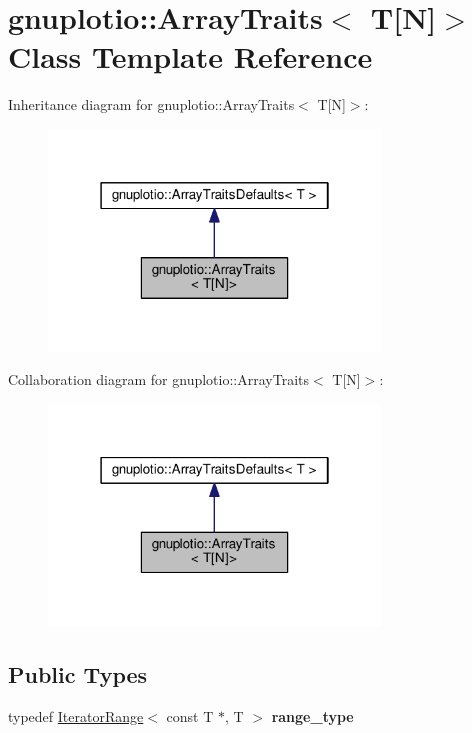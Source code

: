 \hypertarget{classgnuplotio_1_1_array_traits_3_01_t[_n]_4}{}\section{gnuplotio\+:\+:Array\+Traits$<$ T\mbox{[}N\mbox{]}$>$ Class Template Reference}
\label{classgnuplotio_1_1_array_traits_3_01_t[_n]_4}


Inheritance diagram for gnuplotio\+:\+:Array\+Traits$<$ T\mbox{[}N\mbox{]}$>$\+:
\nopagebreak
\begin{figure}[H]
\begin{center}
\leavevmode
\includegraphics[width=250pt]{classgnuplotio_1_1_array_traits_3_01_t[_n]_4__inherit__graph}
\end{center}
\end{figure}


Collaboration diagram for gnuplotio\+:\+:Array\+Traits$<$ T\mbox{[}N\mbox{]}$>$\+:
\nopagebreak
\begin{figure}[H]
\begin{center}
\leavevmode
\includegraphics[width=250pt]{classgnuplotio_1_1_array_traits_3_01_t[_n]_4__coll__graph}
\end{center}
\end{figure}
\subsection*{Public Types}
\begin{DoxyCompactItemize}
\item 
typedef \hyperlink{classgnuplotio_1_1_iterator_range}{Iterator\+Range}$<$ const T $\ast$, T $>$ {\bfseries range\+\_\+type}\hypertarget{classgnuplotio_1_1_array_traits_3_01_t[_n]_4_a926f3c3d14fbe82aab7b70ccc16d20fb}{}\label{classgnuplotio_1_1_array_traits_3_01_t[_n]_4_a926f3c3d14fbe82aab7b70ccc16d20fb}

\end{DoxyCompactItemize}
